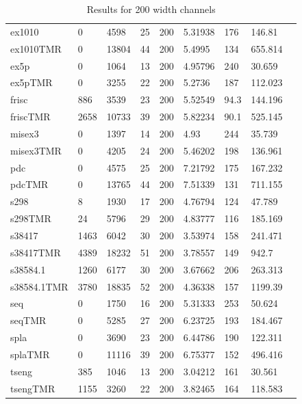 \documentclass[12pt,final,oneside]{memoir} %
\begin{document}
\begin{table}
\begin{adjustwidth}{-1cm}{-1.2cm}
\begin{tabularx}{1.1\textwidth}{XXXXlXXXX}
ex1010 & 0 & 4598 & 25 & 200 & 5.31938 &176 & 146.81\\
ex1010TMR & 0 & 13804 & 44 & 200 & 5.4995 &134 & 655.814\\\midrule
ex5p & 0 & 1064 & 13 & 200 & 4.95796 &240 & 30.659\\
ex5pTMR & 0 & 3255 & 22 & 200 & 5.2736 &187 & 112.023\\\midrule
frisc & 886 & 3539 & 23 & 200 & 5.52549 &94.3 & 144.196\\
friscTMR & 2658 & 10733 & 39 & 200 & 5.82234 &90.1 & 525.145\\\midrule
misex3 & 0 & 1397 & 14 & 200 & 4.93 &244 & 35.739\\
misex3TMR & 0 & 4205 & 24 & 200 & 5.46202 &198 & 136.961\\\midrule
pdc & 0 & 4575 & 25 & 200 & 7.21792 &175 & 167.232\\
pdcTMR & 0 & 13765 & 44 & 200 & 7.51339 &131 & 711.155\\\midrule
s298 & 8 & 1930 & 17 & 200 & 4.76794 &124 & 47.789\\
s298TMR & 24 & 5796 & 29 & 200 & 4.83777 &116 & 185.169\\\midrule
s38417 & 1463 & 6042 & 30 & 200 & 3.53974 &158 & 241.471\\
s38417TMR & 4389 & 18232 & 51 & 200 & 3.78557 &149 & 942.7\\\midrule
s38584.1 & 1260 & 6177 & 30 & 200 & 3.67662 &206 & 263.313\\
s38584.1TMR & 3780 & 18835 & 52 & 200 & 4.36338 &157 & 1199.39\\\midrule
seq & 0 & 1750 & 16 & 200 & 5.31333 &253 & 50.624\\
seqTMR & 0 & 5285 & 27 & 200 & 6.23725 &193 & 184.467\\\midrule
spla & 0 & 3690 & 23 & 200 & 6.44786 &190 & 122.311\\
splaTMR & 0 & 11116 & 39 & 200 & 6.75377 &152 & 496.416\\\midrule
tseng & 385 & 1046 & 13 & 200 & 3.04212 &161 & 30.561\\
tsengTMR & 1155 & 3260 & 22 & 200 & 3.82465 &164 & 118.583\\\bottomrule
    \end{tabularx}
    \caption{Results for 200 width channels}
    \label{Results200}
\end{adjustwidth}
\end{table}
\end{document}
